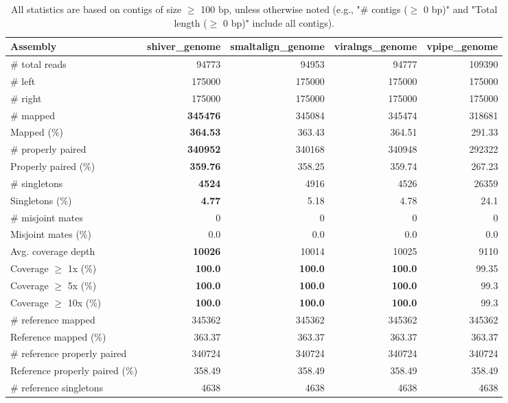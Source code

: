 \documentclass[12pt,a4paper]{article}
\begin{document}
\begin{table}[ht]
\begin{center}
\caption{All statistics are based on contigs of size $\geq$ 100 bp, unless otherwise noted (e.g., "\# contigs ($\geq$ 0 bp)" and "Total length ($\geq$ 0 bp)" include all contigs).}
\begin{tabular}{|l*{4}{|r}|}
\hline
Assembly & shiver\_genome & smaltalign\_genome & viralngs\_genome & vpipe\_genome \\ \hline
\# total reads & 94773 & 94953 & 94777 & 109390 \\ \hline
\# left & 175000 & 175000 & 175000 & 175000 \\ \hline
\# right & 175000 & 175000 & 175000 & 175000 \\ \hline
\# mapped & {\bf 345476} & 345084 & 345474 & 318681 \\ \hline
Mapped (\%) & {\bf 364.53} & 363.43 & 364.51 & 291.33 \\ \hline
\# properly paired & {\bf 340952} & 340168 & 340948 & 292322 \\ \hline
Properly paired (\%) & {\bf 359.76} & 358.25 & 359.74 & 267.23 \\ \hline
\# singletons & {\bf 4524} & 4916 & 4526 & 26359 \\ \hline
Singletons (\%) & {\bf 4.77} & 5.18 & 4.78 & 24.1 \\ \hline
\# misjoint mates & 0 & 0 & 0 & 0 \\ \hline
Misjoint mates (\%) & 0.0 & 0.0 & 0.0 & 0.0 \\ \hline
Avg. coverage depth & {\bf 10026} & 10014 & 10025 & 9110 \\ \hline
Coverage $\geq$ 1x (\%) & {\bf 100.0} & {\bf 100.0} & {\bf 100.0} & 99.35 \\ \hline
Coverage $\geq$ 5x (\%) & {\bf 100.0} & {\bf 100.0} & {\bf 100.0} & 99.3 \\ \hline
Coverage $\geq$ 10x (\%) & {\bf 100.0} & {\bf 100.0} & {\bf 100.0} & 99.3 \\ \hline
\# reference mapped & 345362 & 345362 & 345362 & 345362 \\ \hline
Reference mapped (\%) & 363.37 & 363.37 & 363.37 & 363.37 \\ \hline
\# reference properly paired & 340724 & 340724 & 340724 & 340724 \\ \hline
Reference properly paired (\%) & 358.49 & 358.49 & 358.49 & 358.49 \\ \hline
\# reference singletons & 4638 & 4638 & 4638 & 4638 \\ \hline

\end{tabular}
\end{center}
\end{table}
\end{document}
